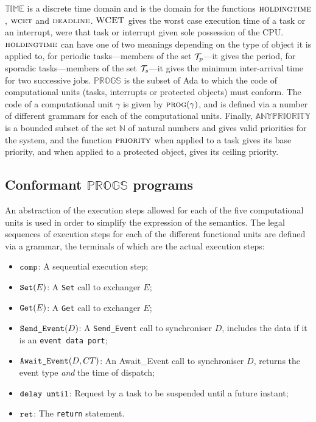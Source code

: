 $\scriptstyle \mathbb{TIME}$ is a discrete time domain and is the
domain for the functions $\text{\scshape holdingtime}$,
$\text{\scshape wcet}$ and $\text{\scshape deadline}$. $\text{\scshape
  WCET}$ gives the worst case execution time of a task or an
interrupt, were that task or interrupt given sole possession of the
CPU. $\text{\scshape holdingtime}$ can have one of two meanings
depending on the type of object it is applied to, for periodic
tasks---members of the set ${\cal T}_p$---it gives the period, for
sporadic tasks---members of the set ${\cal T}_s$---it gives the
minimum inter-arrival time for two successive jobs. $\scriptstyle
\mathbb{PROGS}$ is the subset of Ada to which the code of
computational units (tasks, interrupts or protected objects) must
conform. The code of a computational unit $\gamma$ is given by
$\text{\scshape prog}(\gamma)$, and is defined via a number of
different grammars for each of the computational units. Finally,
$\scriptstyle \mathbb{ANYPRIORITY}$ is a bounded subset of the set
$\mathbb{N}$ of natural numbers and gives valid priorities for the
system, and the function $\text{\scshape priority}$ when applied to a
task gives its base priority, and when applied to a protected object,
gives its ceiling priority.

\subsection{Conformant ${\scriptstyle \mathbb{PROGS}}$ programs}
An abstraction of the execution steps allowed for each of the five
computational units is used in order to simplify the expression of the
semantics. The legal sequences of execution steps for each of the
different functional units are defined via a grammar, the terminals of
which are the actual execution steps:

\begin{itemize} 
  \item ${\text{\ttfamily comp}}$: A sequential execution step;
  \item ${\text{\ttfamily Set}}(E)$: A \texttt{Set} call to exchanger
    $E$;
  \item ${\text{\ttfamily Get}}(E)$: A \texttt{Get} call to exchanger
    $E$; 
  \item ${\text{\ttfamily Send\_Event}}(D)$: A \texttt{Send\_Event}
    call to synchroniser $D$, includes the data if it is an
    \texttt{event data port}; 
  \item ${\text{\ttfamily Await\_Event}}(D, CT)$: An Await\_Event call
    to synchroniser $D$, returns the event type \emph{and} the time of
    dispatch;
  \item ${\text{\ttfamily delay until}}$: Request by a task to be
    suspended until a future instant;
  \item ${\text{\ttfamily ret}}$: The \texttt{return} statement.
\end{itemize}

